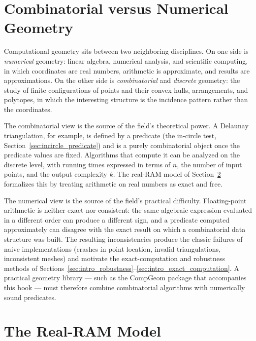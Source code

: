 
\section{Combinatorial versus Numerical Geometry}
\label{sec:intro_combinatorial_vs_numerical}

Computational geometry sits between two neighboring disciplines. On one
side is \emph{numerical} geometry: linear algebra, numerical analysis, and
scientific computing, in which coordinates are real numbers, arithmetic is
approximate, and results are approximations. On the other side is
\emph{combinatorial} and \emph{discrete} geometry: the study of finite
configurations of points and their convex hulls, arrangements, and
polytopes, in which the interesting structure is the incidence pattern
rather than the coordinates.

The combinatorial view is the source of the field's theoretical power. A
Delaunay triangulation, for example, is defined by a predicate (the
in-circle test, Section~\ref{sec:incircle_predicate}) and is a purely
combinatorial object once the predicate values are fixed. Algorithms that
compute it can be analyzed on the discrete level, with running times
expressed in terms of $n$, the number of input points, and the output
complexity $k$. The real-RAM model of Section~\ref{sec:intro_real_ram}
formalizes this by treating arithmetic on real numbers as exact and free.

The numerical view is the source of the field's practical difficulty.
Floating-point arithmetic is neither exact nor consistent: the same
algebraic expression evaluated in a different order can produce a different
sign, and a predicate computed approximately can disagree with the exact
result on which a combinatorial data structure was built. The resulting
inconsistencies produce the classic failures of naive implementations
(crashes in point location, invalid triangulations, inconsistent meshes)
and motivate the exact-computation and robustness methods of
Sections~\ref{sec:intro_robustness}--\ref{sec:intro_exact_computation}. A
practical geometry library --- such as the CompGeom package that accompanies
this book --- must therefore combine combinatorial algorithms with
numerically sound predicates.

\section{The Real-RAM Model}
\label{sec:intro_real_ram}


